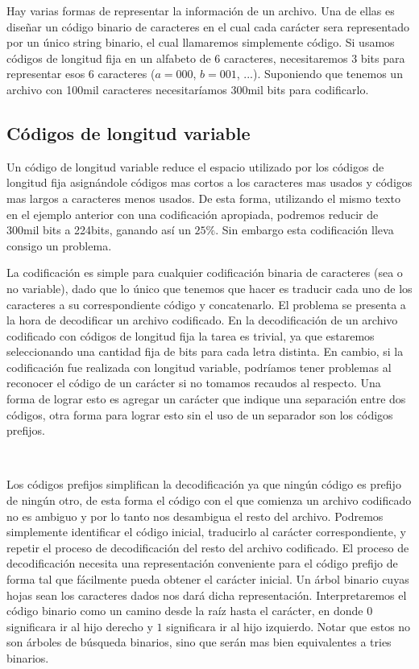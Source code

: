 Hay varias formas de representar la informaci\'on de un archivo. Una de ellas es dise\~nar un c\'odigo binario de caracteres en el cual cada car\'acter sera representado por un \'unico string binario, el cual llamaremos simplemente c\'odigo. Si usamos c\'odigos de longitud fija en un alfabeto de $6$ caracteres, necesitaremos $3$ bits para representar esos $6$ caracteres ($a=000$, $b=001$, ...). Suponiendo que tenemos un archivo con 100mil caracteres necesitar\'iamos 300mil bits para codificarlo.

\subsection{C\'odigos de longitud variable}

Un c\'odigo de longitud variable reduce el espacio utilizado por los c\'odigos de longitud fija asign\'andole c\'odigos mas cortos a los caracteres mas usados y c\'odigos mas largos a caracteres menos usados. De esta forma, utilizando el mismo texto en el ejemplo anterior con una codificaci\'on apropiada, podremos reducir de 300mil bits a 224bits, ganando as\'i un $25\%$. Sin embargo esta codificaci\'on lleva consigo un problema.

La codificaci\'on es simple para cualquier codificaci\'on binaria de caracteres (sea o no variable), dado que lo \'unico que tenemos que hacer es traducir cada uno de los caracteres a su correspondiente c\'odigo y concatenarlo. El problema se presenta a la hora de decodificar un archivo codificado. En la decodificaci\'on de un archivo codificado con c\'odigos de longitud fija la tarea es trivial, ya que estaremos seleccionando una cantidad fija de bits para cada letra distinta. En cambio, si la codificaci\'on fue realizada con longitud variable, podr\'iamos tener problemas al reconocer el c\'odigo de un car\'acter si no tomamos recaudos al respecto. Una forma de lograr esto es agregar un car\'acter que indique una separaci\'on entre dos c\'odigos, otra forma para lograr esto sin el uso de un separador son los c\'odigos prefijos.

~

Los c\'odigos prefijos simplifican la decodificaci\'on ya que ning\'un c\'odigo es prefijo de ning\'un otro, de esta forma el c\'odigo con el que comienza un archivo codificado no es ambiguo y por lo tanto nos desambigua el resto del archivo. Podremos simplemente identificar el c\'odigo inicial, traducirlo al car\'acter correspondiente, y repetir el proceso de decodificaci\'on del resto del archivo codificado. El proceso de decodificaci\'on necesita una representaci\'on conveniente para el c\'odigo prefijo de forma tal que f\'acilmente pueda obtener el car\'acter inicial. Un \'arbol binario cuyas hojas sean los caracteres dados nos dar\'a dicha representaci\'on. Interpretaremos el c\'odigo binario como un camino desde la ra\'iz hasta el car\'acter, en donde $0$ significara ir al hijo derecho y $1$ significara ir al hijo izquierdo. Notar que estos no son \'arboles de b\'usqueda binarios, sino que ser\'an mas bien equivalentes a tries binarios.

